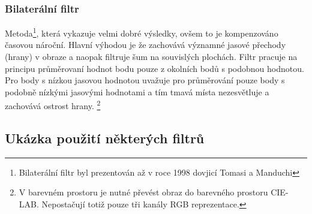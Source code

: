 \documentclass{thesis}%
\begin{document}
\subsubsection{Bilaterální filtr}
Metoda\footnote[10]{Bilaterální filtr byl prezentován až v roce 1998 dovjicí Tomasi a Manduchi}, která vykazuje velmi dobré výsledky, ovšem to je kompenzováno časovou nároční.  Hlavní výhodou je že zachovává významné jasové přechody (hrany) v obraze a naopak filtruje šum na souvislých plochách. Filtr pracuje na principu průměrovaní hodnot bodu pouze z okolních bodů s podobnou hodnotou. Pro body s nízkou jasovou hodnotou uvažuje pro průměrování pouze body s podobně nízkými jasovými hodnotami a tím tmavá místa nezesvětluje a zachovává ostrost hrany. \footnote[11]{V barevném prostoru je nutné převést obraz do barevného prostoru CIE-LAB. Nepostačují totiž pouze tři kanály RGB reprezentace.}
\subsection{Ukázka použití některých filtrů}
\end{document}
